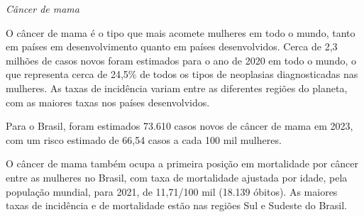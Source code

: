 \begin{myquote}





\textit{Câncer de mama}

O câncer de mama é o tipo que mais acomete mulheres em todo o mundo, tanto em
países em desenvolvimento quanto em países desenvolvidos. Cerca de 2,3 milhões
de casos novos foram estimados para o ano de 2020 em todo o mundo, o que
representa cerca de 24,5\% de todos os tipos de neoplasias diagnosticadas nas
mulheres. As taxas de incidência variam entre as diferentes regiões do
planeta, com as maiores taxas nos países desenvolvidos.

Para o Brasil, foram estimados 73.610 casos novos de câncer de mama em 2023,
com um risco estimado de 66,54 casos a cada 100 mil mulheres.

O câncer de mama também ocupa a primeira posição em mortalidade por câncer
entre as mulheres no Brasil, com taxa de mortalidade ajustada por idade, pela
população mundial, para 2021, de 11,71/100 mil (18.139 óbitos). As maiores
taxas de incidência e de mortalidade estão nas regiões Sul e Sudeste do
Brasil.


\end{myquote}
